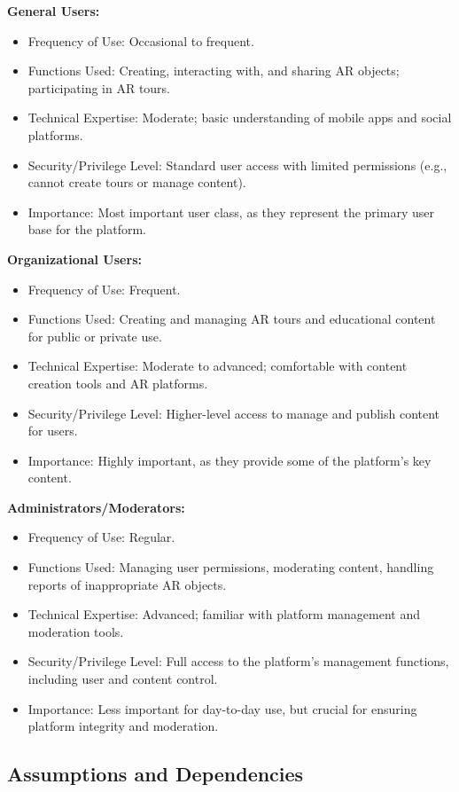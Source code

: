 \documentclass{article}
\begin{document}
\textbf{General Users:}
\begin{itemize}
    \item Frequency of Use: Occasional to frequent.
    \item Functions Used: Creating, interacting with, and sharing AR objects; participating in AR tours.
    \item Technical Expertise: Moderate; basic understanding of mobile apps and social platforms.
    \item Security/Privilege Level: Standard user access with limited permissions (e.g., cannot create tours or manage content).
    \item Importance: Most important user class, as they represent the primary user base for the platform.
\end{itemize}

\textbf{Organizational Users:}
\begin{itemize}
    \item Frequency of Use: Frequent.
    \item Functions Used: Creating and managing AR tours and educational content for public or private use.
    \item Technical Expertise: Moderate to advanced; comfortable with content creation tools and AR platforms.
    \item Security/Privilege Level: Higher-level access to manage and publish content for users.
    \item Importance: Highly important, as they provide some of the platform’s key content.
\end{itemize}

\textbf{Administrators/Moderators:}
\begin{itemize}
    \item Frequency of Use: Regular.
    \item Functions Used: Managing user permissions, moderating content, handling reports of inappropriate AR objects.
    \item Technical Expertise: Advanced; familiar with platform management and moderation tools.
    \item Security/Privilege Level: Full access to the platform's management functions, including user and content control.
    \item Importance: Less important for day-to-day use, but crucial for ensuring platform integrity and moderation.
\end{itemize}

\subsection{Assumptions and Dependencies}
\end{document}
